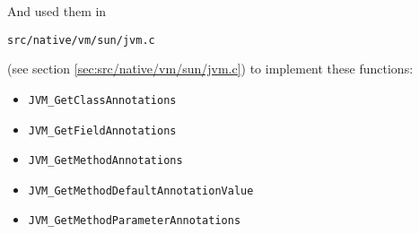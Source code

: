 \documentclass[a4paper, 10pt, titlepage]{scrartcl} %
\begin{document}
And used them in \begin{scriptsize}\verb|src|\hspace{0.0pt}\verb|/|\hspace{0.0pt}\verb|native|\hspace{0.0pt}\verb|/|\hspace{0.0pt}\verb|vm|\hspace{0.0pt}\verb|/|\hspace{0.0pt}\verb|sun|\hspace{0.0pt}\verb|/|\hspace{0.0pt}\verb|jvm|\hspace{0.0pt}\verb|.|\hspace{0.0pt}\verb|c|\end{scriptsize} (see section \ref{sec:src/native/vm/sun/jvm.c}) to
implement these functions:
\begin{itemize}
 \item \begin{scriptsize}\verb|JVM_GetClassAnnotations|\end{scriptsize}
 \item \begin{scriptsize}\verb|JVM_GetFieldAnnotations|\end{scriptsize}
 \item \begin{scriptsize}\verb|JVM_GetMethodAnnotations|\end{scriptsize}
 \item \begin{scriptsize}\verb|JVM_GetMethodDefaultAnnotationValue|\end{scriptsize}
 \item \begin{scriptsize}\verb|JVM_GetMethodParameterAnnotations|\end{scriptsize}
\end{itemize}
\end{document}
